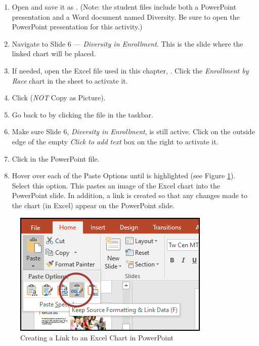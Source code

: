 \begin{enumbox}
	\begin{enumerate}
		\item Open  and save it as . (Note: the student files include both a PowerPoint presentation and a Word document named Diversity. Be sure to open the PowerPoint presentation for this activity.) 
		\item Navigate to Slide $ 6 $ --- \textit{Diversity in Enrollment}. This is the slide where the linked chart will be placed.
		\item If needed, open the Excel file used in this chapter, . Click the \textit{Enrollment by Race} chart in the  sheet to activate it.
		\item Click  (\textit{NOT} Copy as Picture).
		\item Go back to  by clicking the file in the taskbar.
		\item Make sure Slide 6, \textit{Diversity in Enrollment}, is still active. Click on the outside edge of the empty \textit{Click to add text} box on the right to activate it.
		\item Click  in the PowerPoint file.
		\item Hover over each of the Paste Options until  is highlighted (see Figure \ref{04:fig49}). Select this option. This pastes an image of the Excel chart into the PowerPoint slide. In addition, a link is created so that any changes made to the chart (in Excel) appear on the PowerPoint slide.
	\end{enumerate}
\end{enumbox}
	
\begin{figure}[H]
	\centering
	\includegraphics[width=\maxwidth{.75\linewidth}]{gfx/ch04_fig49}
	\caption{Creating a Link to an Excel Chart in PowerPoint}
	\label{04:fig49}
\end{figure}

